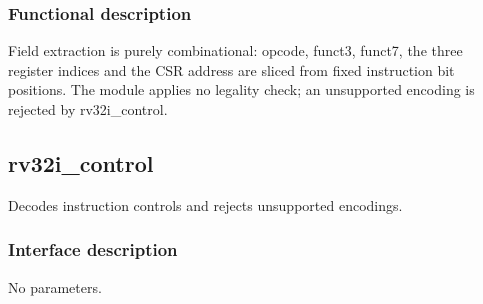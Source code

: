\documentclass[11pt]{article}
\begin{document}
\subsubsection{Functional description}
\noindent Field extraction is purely combinational: opcode, funct3, funct7, the three register indices and the CSR address are sliced from fixed instruction bit positions. The module applies no legality check; an unsupported encoding is rejected by rv32i\_control.\par\medskip

\subsection{rv32i\_control}
Decodes instruction controls and rejects unsupported encodings.
\subsubsection{Interface description}
\noindent No parameters.\par\medskip
\end{document}
